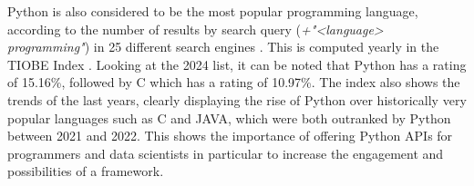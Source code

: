 Python is also considered to be the most popular programming language, according to the number of results by search query (\textit{+"<language> programming"}) in 25 different search engines \cite{TIOBEIndexa}. This is computed yearly in the TIOBE Index \cite{TIOBEIndex}. Looking at the 2024 list, it can be noted that Python has a rating of 15.16\%, followed by C which has a rating of 10.97\%. The index also shows the trends of the last years, clearly displaying the rise of Python over historically very popular languages such as C and JAVA, which were both outranked by Python between 2021 and 2022. This shows the importance of offering Python \glspl{API} for programmers and data scientists in particular to increase the engagement and possibilities of a framework.